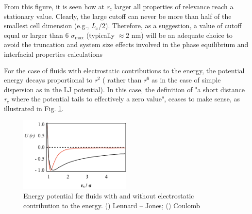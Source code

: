 \documentclass[9pt,bestpractices]{livecoms}
\begin{document}
From this figure, it is seen how at  \textit{r}$_{c}$ larger all properties of
relevance reach a stationary value. Clearly, the large cutoff can never be more
than half of the smallest cell dimension (e.g., \textit{L}$_{x}$/2).
Therefore, as a suggestion, a value of cutoff equal or larger than
6 ${\sigma}$$_{\mathrm{max}}$ (typically $\approx 2$ nm) will be an adequate choice to avoid the
truncation and system size effects involved in the phase equilibrium and
interfacial properties calculations

For the case of fluids with electrostatic contributions to the energy, the
potential energy decays proportional to \textit{r}$^{2}$ ( rather than
\textit{r}$^{6}$ as in the case of simple dispersion as in the LJ potential).
In this case, the definition of "a short distance \textit{r}$_{c}$ where the
potential tails to effectively a zero value", ceases to make sense, as
illustrated in Fig. \ref{fig:6}. 

\begin{figure}
\includegraphics[width=0.5\textwidth]{gfx/image49.png}
\caption{Energy potential for fluids with and without electrostatic contribution to the energy. (\textcolor{color-3}{\textemdash}) Lennard -- Jones; (\textemdash) Coulomb}
\label{fig:6}
\end{figure}
\end{document}
